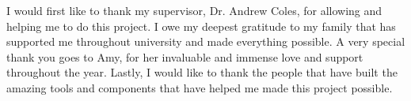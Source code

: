 I would first like to thank my supervisor, Dr. Andrew Coles, for allowing and helping me to do this project.\newline
\indent I owe my deepest gratitude to my family that has supported me throughout university and made everything possible. A very special thank you goes to Amy, for her invaluable and immense love and support throughout the year.\newline
\indent Lastly, I would like to thank the people that have built the amazing tools and components that have helped me made this project possible.